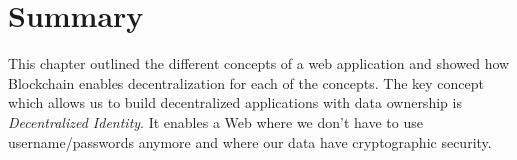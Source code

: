 \section{Summary}
	This chapter outlined the different concepts of a web application and showed how Blockchain enables decentralization for each of the concepts. The key concept which allows us to build decentralized applications with data ownership is \textit{Decentralized Identity}. It enables a Web where we don't have to use username/passwords anymore and where our data have cryptographic security.